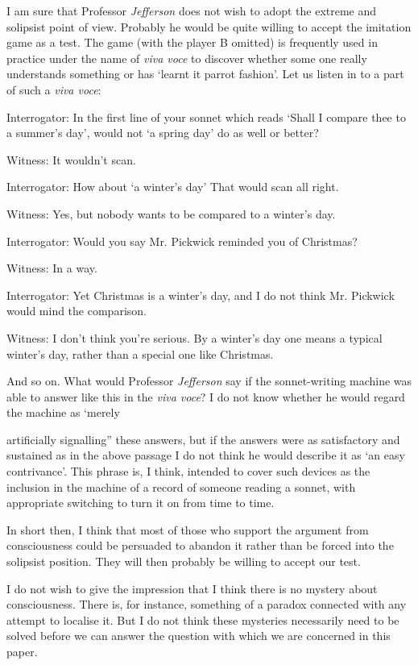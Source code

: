 \documentclass[10pt]{article} %
\newcommand{\dialogueturn}[2]{%
    \noindent\normalfont #1: #2\par %
    \vspace{0.2\baselineskip}%
}
\begin{document}
I am sure that Professor \textit{Jefferson} does not wish to adopt the extreme and solipsist point of view. Probably he would be quite willing to accept the imitation game as a test. The game (with the player B omitted) is frequently used in practice under the name of \textit{viva voce} to discover whether some one really understands something or has `learnt it parrot fashion'. Let us listen in to a part of such a \textit{viva voce}:

\vspace{0.5\baselineskip} %
\dialogueturn{Interrogator}{In the first line of your sonnet which reads `Shall I compare thee to a summer's day', would not `a spring day' do as well or better?}
\dialogueturn{Witness}{It wouldn't scan.}
\dialogueturn{Interrogator}{How about `a winter's day' That would scan all right.}
\dialogueturn{Witness}{Yes, but nobody wants to be compared to a winter's day.}
\dialogueturn{Interrogator}{Would you say Mr. Pickwick reminded you of Christmas?}
\dialogueturn{Witness}{In a way.}
\dialogueturn{Interrogator}{Yet Christmas is a winter's day, and I do not think Mr. Pickwick would mind the comparison.}
\dialogueturn{Witness}{I don't think you're serious. By a winter's day one means a typical winter's day, rather than a special one like Christmas.}

And so on. What would Professor \textit{Jefferson} say if the sonnet-writing machine was able to answer like this in the \textit{viva voce}? I do not know whether he would regard the machine as `merely

artificially signalling'' these answers, but if the answers were as satisfactory and sustained as in the above passage I do not think he would describe it as `an easy contrivance'. This phrase is, I think, intended to cover such devices as the inclusion in the machine of a record of someone reading a sonnet, with appropriate switching to turn it on from time to time.

In short then, I think that most of those who support the argument from consciousness could be persuaded to abandon it rather than be forced into the solipsist position. They will then probably be willing to accept our test.

I do not wish to give the impression that I think there is no mystery about consciousness. There is, for instance, something of a paradox connected with any attempt to localise it. But I do not think these mysteries necessarily need to be solved before we can answer the question with which we are concerned in this paper.
\vspace{0.5\baselineskip} %
\end{document}
